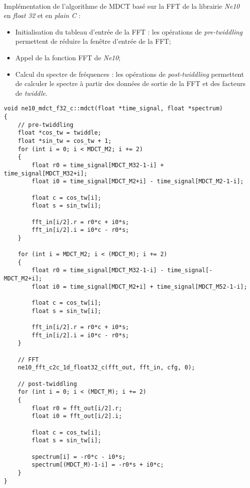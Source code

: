 \documentclass{article}
\begin{document}
\paragraph{}
Implémentation de l'algorithme de MDCT basé sur la FFT de la librairie \emph{Ne10} en \emph{float 32} et en \emph{plain C} :
\begin{itemize}
    \item Initialisation du tableau d'entrée de la FFT : les opérations de \emph{pre-twiddling} permettent de réduire la fenêtre d'entrée de la FFT;
    \item Appel de la fonction FFT de \emph{Ne10};
    \item Calcul du spectre de fréquences : les opérations de \emph{post-twiddling} permettent de calculer le spectre à partir des données de sortie de la FFT et des facteurs de \emph{twiddle}.
\end{itemize}
\lstset{language=C++}
\begin{lstlisting}
void ne10_mdct_f32_c::mdct(float *time_signal, float *spectrum)
{
    // pre-twiddling
    float *cos_tw = twiddle;
    float *sin_tw = cos_tw + 1;
    for (int i = 0; i < MDCT_M2; i += 2)
    {
        float r0 = time_signal[MDCT_M32-1-i] + time_signal[MDCT_M32+i];
        float i0 = time_signal[MDCT_M2+i] - time_signal[MDCT_M2-1-i];

        float c = cos_tw[i];
        float s = sin_tw[i];

        fft_in[i/2].r = r0*c + i0*s;
        fft_in[i/2].i = i0*c - r0*s;
    }

    for (int i = MDCT_M2; i < (MDCT_M); i += 2)
    {
        float r0 = time_signal[MDCT_M32-1-i] - time_signal[-MDCT_M2+i];
        float i0 = time_signal[MDCT_M2+i] + time_signal[MDCT_M52-1-i];

        float c = cos_tw[i];
        float s = sin_tw[i];

        fft_in[i/2].r = r0*c + i0*s;
        fft_in[i/2].i = i0*c - r0*s;
    }

    // FFT
    ne10_fft_c2c_1d_float32_c(fft_out, fft_in, cfg, 0);

    // post-twiddling
    for (int i = 0; i < (MDCT_M); i += 2)
    {
        float r0 = fft_out[i/2].r;
        float i0 = fft_out[i/2].i;

        float c = cos_tw[i];
        float s = sin_tw[i];

        spectrum[i] = -r0*c - i0*s;
        spectrum[(MDCT_M)-1-i] = -r0*s + i0*c;
    }
}
\end{lstlisting}
\end{document}
